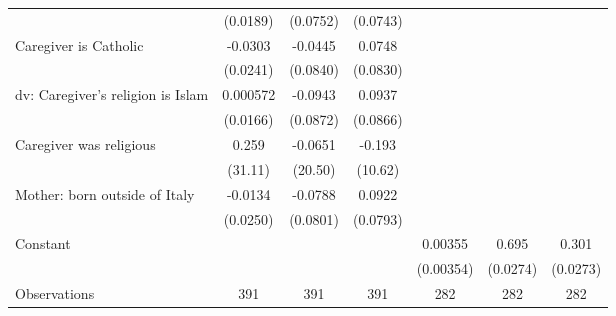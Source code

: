 {\begin{tabular}{l*{6}{c}}
                    &    (0.0189)         &    (0.0752)         &    (0.0743)         &                     &                     &                     \\
\addlinespace
Caregiver is Catholic&     -0.0303         &     -0.0445         &      0.0748         &                     &                     &                     \\
                    &    (0.0241)         &    (0.0840)         &    (0.0830)         &                     &                     &                     \\
\addlinespace
dv: Caregiver's religion is Islam&    0.000572         &     -0.0943         &      0.0937         &                     &                     &                     \\
                    &    (0.0166)         &    (0.0872)         &    (0.0866)         &                     &                     &                     \\
\addlinespace
Caregiver was religious&       0.259         &     -0.0651         &      -0.193         &                     &                     &                     \\
                    &     (31.11)         &     (20.50)         &     (10.62)         &                     &                     &                     \\
\addlinespace
Mother: born outside of Italy&     -0.0134         &     -0.0788         &      0.0922         &                     &                     &                     \\
                    &    (0.0250)         &    (0.0801)         &    (0.0793)         &                     &                     &                     \\
\addlinespace
Constant            &                     &                     &                     &     0.00355         &       0.695\sym{***}&       0.301\sym{***}\\
                    &                     &                     &                     &   (0.00354)         &    (0.0274)         &    (0.0273)         \\
\midrule
Observations        &         391         &         391         &         391         &         282         &         282         &         282         \\
\bottomrule
\end{tabular}
}
